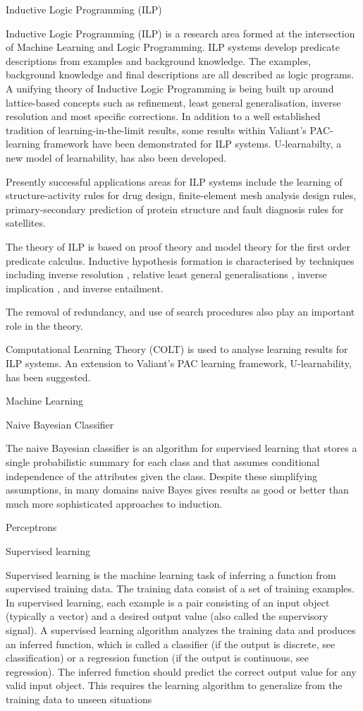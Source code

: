 Inductive Logic Programming (ILP)

Inductive Logic Programming (ILP) is a research area formed at the intersection of Machine Learning and Logic Programming. ILP systems develop predicate descriptions from examples and background knowledge. The examples, background knowledge and final descriptions are all described as logic programs. A unifying theory of Inductive Logic Programming is being built up around lattice-based concepts such as refinement, least general generalisation, inverse resolution and most specific corrections. In addition to a well established tradition of learning-in-the-limit results, some results within Valiant's PAC-learning framework have been demonstrated for ILP systems. U-learnabilty, a new model of learnability, has also been developed.


Presently successful applications areas for ILP systems include the learning of structure-activity rules for drug design, finite-element mesh analysis design rules, primary-secondary prediction of protein structure and fault diagnosis rules for satellites.


The theory of ILP is based on proof theory and model theory for the first order predicate calculus. Inductive hypothesis formation is characterised by techniques including inverse resolution , relative least general generalisations , inverse implication , and inverse entailment.


The removal of redundancy, and use of search procedures also play an important role in the theory.


Computational Learning Theory (COLT) is used to analyse learning results for ILP systems. An extension to Valiant's PAC learning framework, U-learnability, has been suggested.

Machine Learning

Naive Bayesian Classifier

The naive Bayesian classifier is an algorithm for supervised learning that stores a single probabilistic summary for each class and that assumes conditional independence of the attributes given the class. Despite these simplifying assumptions, in many domains naive Bayes gives results as good or better than much more sophisticated approaches to induction. 

Perceptrons



Supervised learning


Supervised learning is the machine learning task of inferring a function from supervised training data. The training data consist of a set of training examples. In supervised learning, each example is a pair consisting of an input object (typically a vector) and a desired output value (also called the supervisory signal). A supervised learning algorithm analyzes the training data and produces an inferred function, which is called a classifier (if the output is discrete, see classification) or a regression function (if the output is continuous, see regression). The inferred function should predict the correct output value for any valid input object. This requires the learning algorithm to generalize from the training data to unseen situations 

